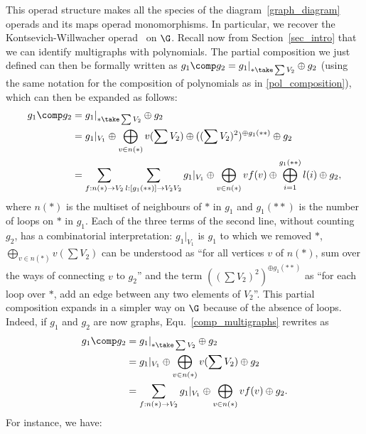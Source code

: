 This operad structure makes all the species of the diagram~\ref{graph_diagram} operads and its maps operad 
monomorphisms. In particular, we recover the Kontsevich-Willwacher operad~\cite{MV19} on $\G$. Recall now 
from Section~\ref{sec_intro} that we can identify multigraphs with polynomials. The partial composition we 
just defined can then be formally written as $g_1\comp g_2 = g_1|_{\ast \take \sum V_2}\oplus g_2$
(using the same notation for the composition of polynomials as in \eqref{pol_composition}), which can then 
be expanded as follows:
\begin{equation}\begin{split}\label{comp_multigraphs}
    g_1\comp g_2 &= g_1|_{\ast \take \sum V_2}\oplus g_2\\
    &= g_1|_{V_1} \oplus\bigoplus_{v\in n(\ast)} v(\sum V_2)\oplus((\sum V_2)^2)^{\oplus g_1(\ast\ast)}\oplus g_2 \\
    &= \sum_{f:n(\ast)\to V_2}\sum_{l:[g_1(\ast\ast)]\to V_2V_2} g_1|_{V_1}\oplus\bigoplus_{v\in n(\ast)}vf(v)\oplus\bigoplus_{i=1}^{g_1(\ast\ast)}l(i) \oplus g_2,
\end{split}\end{equation}
where $n(\ast)$ is the multiset of neighbours of $\ast$ in $g_1$ and $g_1(\ast\ast)$ is the number of loops on 
$\ast$ in $g_1$. Each of the three terms of the second line, without counting $g_2$, has a combinatorial 
interpretation: $g_1|_{V_1}$ is $g_1$ to which we removed $\ast$, $\bigoplus_{v\in n(\ast)} v(\sum V_2)$
can be understood as ``for all vertices $v$ of $n(\ast)$, sum over the ways of connecting $v$ to $g_2$'' 
and the term $((\sum V_2)^2)^{\oplus g_1(\ast\ast)}$ as ``for each loop over $\ast$, add an edge between 
any two elements of $V_2$''. This partial composition expands in a simpler way on $\G$ because of the 
absence of loops. Indeed, if $g_1$ and $g_2$ are now graphs, Equ.~\eqref{comp_multigraphs} rewrites as
\begin{equation}\begin{split}
    g_1\comp g_2 &= g_1|_{\ast \take \sum V_2}\oplus g_2\\
    &= g_1|_{V_1} \oplus\bigoplus_{v\in n(\ast)} v(\sum V_2)\oplus g_2 \\
    &= \sum_{f:n(\ast)\rightarrow V_2} g_1|_{V_1}\oplus\bigoplus_{v\in n(\ast)}vf(v)\oplus g_2.
\end{split}\end{equation}
For instance, we have:

